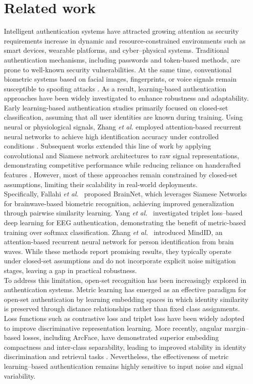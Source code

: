 \documentclass[a4paper,conference]{IEEEtran}
\begin{document}
	\section{Related work}
	Intelligent authentication systems have attracted growing attention as security requirements increase in dynamic and resource-constrained environments such as smart devices, wearable platforms, and cyber--physical systems. Traditional authentication mechanisms, including passwords and token-based methods, are prone to well-known security vulnerabilities. At the same time, conventional biometric systems based on facial images, fingerprints, or voice signals remain susceptible to spoofing attacks \cite{Fallahi2023}. As a result, learning-based authentication approaches have been widely investigated to enhance robustness and adaptability.\\
	Early learning-based authentication studies primarily focused on closed-set classification, assuming that all user identities are known during training. Using neural or physiological signals, Zhang \emph{et al.} employed attention-based recurrent neural networks to achieve high identification accuracy under controlled conditions \cite{Zhang2017}. Subsequent works extended this line of work by applying convolutional and Siamese network architectures to raw signal representations, demonstrating competitive performance while reducing reliance on handcrafted features \cite{Fallahi2023,Yang2022}. However, most of these approaches remain constrained by closed-set assumptions, limiting their scalability in real-world deployments.\\
	Specifically, Fallahi \emph{et al.}~\cite{Fallahi2023} proposed BrainNet, which leverages Siamese Networks for brainwave-based biometric recognition, achieving improved generalization through pairwise similarity learning. Yang \emph{et al.}~\cite{Yang2022} investigated triplet loss--based deep learning for EEG authentication, demonstrating the benefit of metric-based training over softmax classification. Zhang \emph{et al.}~\cite{Zhang2017} introduced MindID, an attention-based recurrent neural network for person identification from brain waves. While these methods report promising results, they typically operate under closed-set assumptions and do not incorporate explicit noise mitigation stages, leaving a gap in practical robustness.\\
	To address this limitation, open-set recognition has been increasingly explored in authentication systems. Metric learning has emerged as an effective paradigm for open-set authentication by learning embedding spaces in which identity similarity is preserved through distance relationships rather than fixed class assignments. Loss functions such as contrastive loss \cite{Hadsell2006} and triplet loss \cite{Schroff2015} have been widely adopted to improve discriminative representation learning. More recently, angular margin--based losses, including ArcFace, have demonstrated superior embedding compactness and inter-class separability, leading to improved stability in identity discrimination and retrieval tasks \cite{Deng2019}. Nevertheless, the effectiveness of metric learning--based authentication remains highly sensitive to input noise and signal variability.\\
\end{document}
